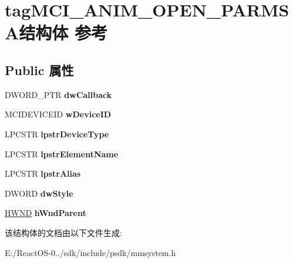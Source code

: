 \hypertarget{structtag_m_c_i___a_n_i_m___o_p_e_n___p_a_r_m_s_a}{}\section{tag\+M\+C\+I\+\_\+\+A\+N\+I\+M\+\_\+\+O\+P\+E\+N\+\_\+\+P\+A\+R\+M\+S\+A结构体 参考}
\label{structtag_m_c_i___a_n_i_m___o_p_e_n___p_a_r_m_s_a}
\subsection*{Public 属性}
\begin{DoxyCompactItemize}
\item 
\mbox{\label{structtag_m_c_i___a_n_i_m___o_p_e_n___p_a_r_m_s_a_ac35b4f30a34f223d1584aa8f23437519}} 
D\+W\+O\+R\+D\+\_\+\+P\+TR {\bfseries dw\+Callback}
\item 
\mbox{\label{structtag_m_c_i___a_n_i_m___o_p_e_n___p_a_r_m_s_a_ad3751deecd4b0b64137fbdbf893f748f}} 
M\+C\+I\+D\+E\+V\+I\+C\+E\+ID {\bfseries w\+Device\+ID}
\item 
\mbox{\label{structtag_m_c_i___a_n_i_m___o_p_e_n___p_a_r_m_s_a_adedb7f84f2476f9c6c64c652113d2ec0}} 
L\+P\+C\+S\+TR {\bfseries lpstr\+Device\+Type}
\item 
\mbox{\label{structtag_m_c_i___a_n_i_m___o_p_e_n___p_a_r_m_s_a_a733e01cda353ec09bd36223a2d16de29}} 
L\+P\+C\+S\+TR {\bfseries lpstr\+Element\+Name}
\item 
\mbox{\label{structtag_m_c_i___a_n_i_m___o_p_e_n___p_a_r_m_s_a_afcc594665f40c4f15b94c7729f056a01}} 
L\+P\+C\+S\+TR {\bfseries lpstr\+Alias}
\item 
\mbox{\label{structtag_m_c_i___a_n_i_m___o_p_e_n___p_a_r_m_s_a_a21c3e56731cd6e6d7e69309fe01bd2b5}} 
D\+W\+O\+RD {\bfseries dw\+Style}
\item 
\mbox{\label{structtag_m_c_i___a_n_i_m___o_p_e_n___p_a_r_m_s_a_a93ff30537cdbe99cb27345f9252e380c}} 
\hyperlink{interfacevoid}{H\+W\+ND} {\bfseries h\+Wnd\+Parent}
\end{DoxyCompactItemize}


该结构体的文档由以下文件生成\+:\begin{DoxyCompactItemize}
\item 
E\+:/\+React\+O\+S-\/0../sdk/include/psdk/mmsystem.\+h\end{DoxyCompactItemize}
